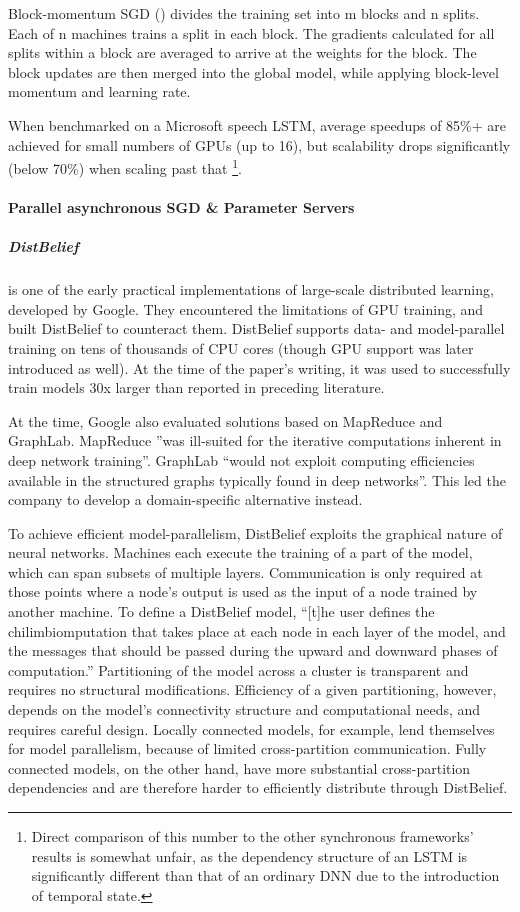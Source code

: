Block-momentum SGD (\citet{Chen2016}) divides the training set into m blocks and n splits. Each of n machines trains a split in each block. The gradients calculated for all splits within a block are averaged to arrive at the weights for the block. The block updates are then merged into the global model, while applying block-level momentum and learning rate.

When benchmarked on a Microsoft speech LSTM, average speedups of 85\%+ are achieved for small numbers of GPUs (up to 16), but scalability drops significantly (below 70\%) when scaling past that \footnote{Direct comparison of this number to the other synchronous frameworks' results is somewhat unfair, as the dependency structure of an LSTM is significantly different than that of an ordinary DNN due to the introduction of temporal state.}.


\paragraph{Parallel asynchronous SGD \& Parameter Servers}

\subparagraph{DistBelief \citep{DistBelief2012}}

is one of the early practical implementations of large-scale distributed learning, developed by Google. They encountered the limitations of GPU training, and built DistBelief to counteract them. DistBelief supports data- and model-parallel training on tens of thousands of CPU cores (though GPU support was later introduced as well\citep{Tensorflow2016}). At the time of the paper's writing, it was used to successfully train models 30x larger than reported in preceding literature.
 
At the time, Google also evaluated solutions based on MapReduce\citep{MapReduce} and GraphLab\citep{GraphLab}. MapReduce ”was ill-suited for the iterative computations inherent in deep network training”. GraphLab “would not exploit computing efficiencies available in the structured graphs typically found in deep networks”. This led the company to develop a domain-specific alternative instead.

To achieve efficient model-parallelism, DistBelief exploits the graphical nature of neural networks. Machines each execute the training of a part of the model, which can span subsets of multiple layers. Communication is only required at those points where a node’s output is used as the input of a node trained by another machine. To define a DistBelief model, “[t]he user defines the chilimbiomputation that takes place at each node in each layer of the model, and the messages that should be passed during the upward and downward phases of computation.” Partitioning of the model across a cluster is transparent and requires no structural modifications. Efficiency of a given partitioning, however, depends on the model’s connectivity structure and computational needs, and requires careful design. Locally connected models, for example, lend themselves for model parallelism, because of limited cross-partition communication. Fully connected models, on the other hand, have more substantial cross-partition dependencies and are therefore harder to efficiently distribute through DistBelief.

